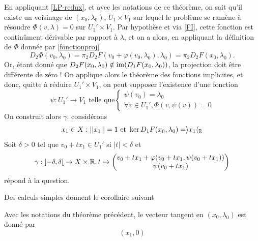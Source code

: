 \documentclass[memoire.tex]{subfiles}
\begin{document}
\begin{preuve}
    En appliquant \ref{LP-redux}, et avec les notations de ce théorème, on sait qu'il existe un voisinage de $(x_0,\lambda_0)$, $U_1\times V_1$ sur lequel le problème se ramène à résoudre $\Phi(v,\lambda)=0$ sur $U_1'\times V_1$.
    Par hypothèse et via \ref{FI}, cette fonction est continûment dérivable par rapport à $\lambda$, et on a alors, en appliquant la définition de $\Phi$ donnée par \eqref{fonctionproj} 
    \begin{equation*}
        D_2\Phi(v_0,\lambda_0)=\pi_2 D_2 F(v_0+\varphi(v_0,\lambda_0),\lambda_0)=\pi_2 D_2 F(x_0,\lambda_0).
    \end{equation*}
    Or, étant donné que $D_2F(x_0,\lambda_0)\notin \operatorname{im}(D_1F(x_0,\lambda_0))$, la projection doit être différente de zéro ! On applique alors le théorème des fonctions implicites, et donc, quitte à réduire $U_1'\times V_1$, on peut supposer l'existence d'une fonction 
    \begin{equation*}
        \psi : U_1'\rightarrow V_1\text{ telle que} 
        \begin{cases}
            \psi(v_0)=\lambda_0
            \\ \forall v\in U_1', \Phi(v,\psi(v))=0 
        \end{cases}
    \end{equation*}
    On construit alors $\gamma$: considérons
    \begin{equation*}
        x_1\in X : ||x_1||=1 \text{ et } \ker D_1 F(x_0,\lambda_0)=\rangle x_1\langle_{\mathbb{R}}
    \end{equation*}
    Soit $\delta>0$ tel que $v_0+t x_1\in U_1'$ si $|t|<\delta $ 
    et 
    \begin{equation*}
        \gamma : \left] -\delta,\delta\right[\rightarrow X\times \mathbb{R},t\mapsto
                    \begin{pmatrix}
                    v_0+t x_1+\varphi(v_0+tx_1,\psi(v_0+tx_1)) \\
                    \psi(v_0+tx_1)
                    \end{pmatrix}
    \end{equation*}
    répond à la question.
\end{preuve}
Des calculs simples donnent le corollaire suivant
\begin{corollaire}
    Avec les notations du théorème précédent, le vecteur tangent en $(x_0,\lambda_0)$ est donné par
    \begin{equation*}
        (x_1,0)
    \end{equation*}
\end{corollaire}
\end{document}
